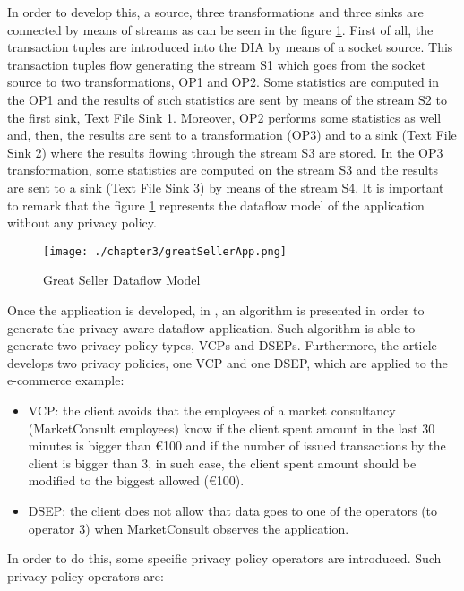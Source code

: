 In order to develop this, a source, three transformations and three sinks are connected by means of streams as can be seen in the figure \ref{fig:Great Seller Dataflow Model}. First of all, the transaction tuples are introduced into the DIA by means of a socket source. This transaction tuples flow generating the stream S1 which goes from the socket source to two transformations, OP1 and OP2. Some statistics are computed in the OP1 and the results of such statistics are sent by means of the stream S2 to the first sink, Text File Sink 1. Moreover, OP2 performs some statistics as well and, then, the results are sent to a transformation (OP3) and to a sink (Text File Sink 2) where the results flowing through the stream S3 are stored. In the OP3 transformation, some statistics are computed on the stream S3 and the results are sent to a sink (Text File Sink 3) by means of the stream S4. It is important to remark that the figure \ref{fig:Great Seller Dataflow Model} represents the dataflow model of the application without any privacy policy.

\begin{figure}
\centering
{\texttt{[image: ./chapter3/greatSellerApp.png]}}
\caption{Great Seller Dataflow Model}
\label{fig:Great Seller Dataflow Model}
\end{figure}

Once the application is developed, in \cite{privacypoliciesarticle}, an algorithm is presented in order to generate the privacy-aware dataflow application. Such algorithm is able to generate two privacy policy types, VCPs and DSEPs. Furthermore, the article develops two privacy policies, one VCP and one DSEP, which are applied to the e-commerce example:

\begin{itemize}
\item VCP: the client avoids that the employees of a market consultancy (MarketConsult employees) know if the client spent amount in the last 30 minutes is bigger than \euro{100} and if the number of issued transactions by the client is bigger than 3, in such case, the client spent amount should be modified to the biggest allowed (\euro{100}).
\item DSEP: the client does not allow that data goes to one of the operators (to operator 3) when MarketConsult observes the application.
\end{itemize}

In order to do this, some specific privacy policy operators are introduced. Such privacy policy operators are:

